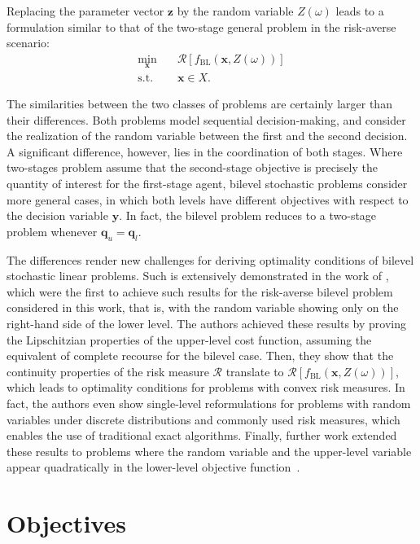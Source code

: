 \documentclass[twoside,11pt]{article}
\begin{document}
Replacing the parameter vector $\bm{z}$ by the random variable $Z(\omega)$ leads to a formulation similar to that of the two-stage general problem in the risk-averse scenario:
\begin{align*}
    \min_{\bm{x}} \quad & \mathcal{R}\left[ f_\text{BL}(\bm{x},Z(\omega)) \right]  \\
    \textrm{s.t.} \quad & \bm{x} \in X
.\end{align*}

The similarities between the two classes of problems are certainly larger than their differences.
Both problems model sequential decision-making, and consider the realization of the random variable between the first and the second decision.
A significant difference, however, lies in the coordination of both stages.
Where two-stages problem assume that the second-stage objective is precisely the quantity of interest for the first-stage agent, bilevel stochastic problems consider more general cases, in which both levels have different objectives with respect to the decision variable $\bm{y}$.
In fact, the bilevel problem reduces to a two-stage problem whenever $\bm{q}_u = \bm{q}_l$.

The differences render new challenges for deriving optimality conditions of bilevel stochastic linear problems.
Such is extensively demonstrated in the work of \citet{burtscheidtRiskAverseModelsBilevel2020}, which were the first to achieve such results for the risk-averse bilevel problem considered in this work, that is, with the random variable showing only on the right-hand side of the lower level.
The authors achieved these results by proving the Lipschitzian properties of the upper-level cost function, assuming the equivalent of complete recourse for the bilevel case.
Then, they show that the continuity properties of the risk measure $\mathcal{R}$ translate to $\mathcal{R}\left[ f_\text{BL}(\bm{x},Z(\omega)) \right] $, which leads to optimality conditions for problems with convex risk measures.
In fact, the authors even show single-level reformulations for problems with random variables under discrete distributions and commonly used risk measures, which enables the use of traditional exact algorithms.
Finally, further work extended these results to problems where the random variable and the upper-level variable appear quadratically in the lower-level objective function~\cite{clausContinuityRiskaverseBilevel2021,clausExistenceSolutionsClass2022a}.


\section*{Objectives}
\end{document}
